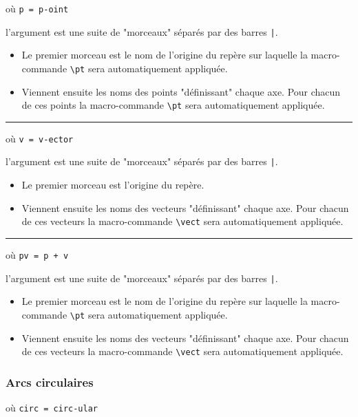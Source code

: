 \documentclass[12pt,a4paper]{article}
\newcommand\env[1]{\texttt{#1}}
\newcommand\macro[1]{\env{\textbackslash{}#1}}
\theoremstyle{definition}
\newcommand\separation{
	\medskip
	\hfill\rule{0.5\textwidth}{0.75pt}\hfill
	\medskip
}
\newcommand\mwhyprefix[2]{%
	\texttt{#1 = #1-#2}%
}
\newcommand\prefix[1]{%
	\texttt{#1}%
}
\begin{document}
 où \quad \mwhyprefix{p}{oint}

\IDarg{} l'argument est une suite de "morceaux" séparés par des barres \verb+|+.

\begin{itemize}[topsep=0pt]
	\item Le premier morceau est le nom de l'origine du repère sur laquelle la macro-commande \macro{pt} sera automatiquement appliquée.

	\item Viennent ensuite les noms des points "définissant" chaque axe. Pour chacun de ces points la macro-commande \macro{pt} sera automatiquement appliquée.
\end{itemize}


\separation

 où \quad \mwhyprefix{v}{ector}

\IDarg{} l'argument est une suite de "morceaux" séparés par des barres \verb+|+.

\begin{itemize}[topsep=0pt]
	\item Le premier morceau est l'origine du repère.

	\item Viennent ensuite les noms des vecteurs "définissant" chaque axe. Pour chacun de ces vecteurs la macro-commande \macro{vect} sera automatiquement appliquée.
\end{itemize}


\separation

 où \quad \prefix{pv = p + v}

\IDarg{} l'argument est une suite de "morceaux" séparés par des barres \verb+|+.

\begin{itemize}[topsep=0pt]
	\item Le premier morceau est le nom de l'origine du repère sur laquelle la macro-commande \macro{pt} sera automatiquement appliquée.

	\item Viennent ensuite les noms des vecteurs "définissant" chaque axe. Pour chacun de ces vecteurs la macro-commande \macro{vect} sera automatiquement appliquée.
\end{itemize}
\subsubsection{Arcs circulaires}

 où \quad \mwhyprefix{circ}{ular}
\end{document}
